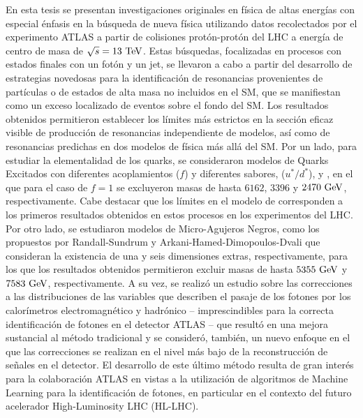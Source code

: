 En esta tesis se presentan investigaciones originales en física de altas energías con especial énfasis en la búsqueda de nueva física utilizando datos recolectados por el experimento \acs{ATLAS} a partir de colisiones protón-protón del \ac{LHC} a energía de centro de masa de \(\sqrt{s} = 13~\text{TeV}\). Estas búsquedas, focalizadas en procesos con estados finales con un fotón y un jet, se llevaron a cabo a partir del desarrollo de estrategias novedosas para la identificación de resonancias provenientes de partículas o de estados de alta masa no incluidos en el \ac{SM}, que se manifiestan como un exceso localizado de eventos sobre el fondo del \ac{SM}. Los resultados obtenidos permitieron establecer los límites más estrictos en la sección eficaz visible de producción de resonancias independiente de modelos, así como de resonancias predichas en dos modelos de física más allá del \ac{SM}. Por un lado, para estudiar la elementalidad de los quarks, se consideraron modelos de Quarks Excitados con diferentes acoplamientos (\(f\)) y diferentes sabores, \qstar (\(u^*/d^*\)), \cstar y \bstar, en el que para el caso de \(f = 1\) se excluyeron masas de hasta \(6162\), \(3396\) y \(2470~\text{GeV}\), respectivamente. Cabe destacar que los límites en el modelo de \cstar  corresponden a los primeros resultados obtenidos en estos procesos en los experimentos del \ac{LHC}. Por otro lado, se estudiaron modelos de Micro-Agujeros Negros, como los propuestos por Randall-Sundrum y Arkani-Hamed-Dimopoulos-Dvali que consideran la existencia de una y seis dimensiones extras, respectivamente, para los que los resultados obtenidos permitieron excluir masas de hasta \(5355~\text{GeV}\) y \(7583~\text{GeV}\), respectivamente. A su vez, se realizó un estudio sobre las correcciones a las distribuciones de las variables que describen el pasaje de los fotones por los calorímetros electromagnético y hadrónico -- imprescindibles para la correcta identificación de fotones en el detector \ac{ATLAS} -- que resultó en una mejora sustancial al método tradicional y se consideró, también, un nuevo enfoque en el que las correcciones se realizan en el nivel más bajo de la reconstrucción de señales en el detector. El desarrollo de este último método resulta de gran interés para la colaboración \ac{ATLAS} en vistas a la utilización de algoritmos de Machine Learning para la identificación de fotones, en particular en el contexto del futuro acelerador High-Luminosity \ac{LHC} (HL-LHC).


\noindent 
